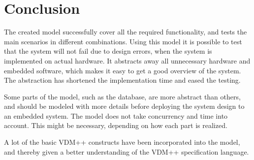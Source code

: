 \chapter{Conclusion}
The created model successfully cover all the required functionality, and tests the main scenarios in different combinations. Using this model it is possible to test that the system will not fail due to design errors, when the system is implemented on actual hardware. 
It abstracts away all unnecessary hardware and embedded software, which makes it easy to get a good overview of the system. The abstraction has shortened the implementation time and eased the testing.
\newline

\noindent
Some parts of the model, such as the database, are more abstract than others, and should be modeled with more details before deploying the system design to an embedded system.
The model does not take concurrency and time into account. This might be necessary, depending on how each part is realized.
\newline

\noindent
A lot of the basic VDM++ constructs have been incorporated into the model, and thereby given a better understanding of the VDM++ specification language.

